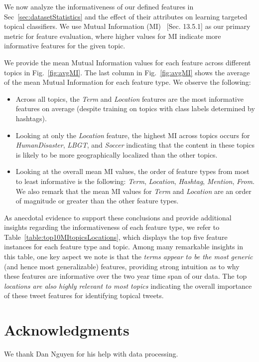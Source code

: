 \documentclass[letterpaper]{article}
\begin{document}
We now analyze the informativeness of our defined
features in Sec~\ref{sec:datasetStatistics} and the effect of their
attributes on learning targeted topical classifiers. 
We use Mutual Information (MI)~\cite{manning_ir} [Sec. 13.5.1] as our primary
metric for feature evaluation,   
where higher values for MI indicate more informative features for the given topic.

We provide the mean Mutual Information
values for each feature across different topics in Fig.~\ref{fig:avgMI}.
The last column in Fig.~\ref{fig:avgMI} shows the
average of the mean Mutual Information for each feature type.  We observe
the following:
\begin{itemize}%
\item Across all topics, the \textit{Term} and \textit{Location} features are the most informative features on average (despite training on topics with class labels determined by hashtags).
\item Looking at only the \textit{Location} feature, the highest MI across topics occurs for  \textit{HumanDisaster}, \textit{LBGT}, and \textit{Soccer} indicating that the content in these topics is likely to be more geographically localized than the other topics.
\item Looking at the overall mean MI values, the order of feature types from most to least informative is the following: \textit{Term}, \textit{Location}, \textit{Hashtag}, \textit{Mention}, \textit{From}.  We also remark that the mean MI values for \textit{Term} and \textit{Location} are an order of magnitude or greater than the other feature types.
\end{itemize}

As anecdotal evidence to support these conclusions and provide additional insights regarding
the informativeness of each feature type, we refer to
Table~\ref{table:top10MItopicsLocations}, which displays the top five feature instances
for each feature type and topic.  Among many remarkable insights in this table, one key aspect  
we note is that the \emph{terms appear to be the most generic} (and hence most generalizable) features,
providing strong intuition as to why these features are informative over the two year time
span of our data.  The top \emph{locations are also highly relevant to most topics} indicating
the overall importance of these tweet features for identifying topical tweets.

\section*{Acknowledgments}
We thank Dan Nguyen for his help with data processing.



\end{document}
